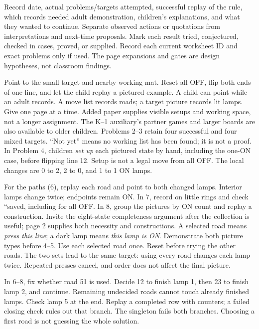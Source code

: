 \documentclass[12pt]{extarticle}
\begin{document}
Record date, actual problems/targets attempted, successful replay of the rule, which records needed adult demonstration, children's explanations, and what they wanted to continue. Separate observed actions or quotations from interpretations and next-time proposals. Mark each result tried, conjectured, checked in cases, proved, or supplied. Record each current worksheet ID and exact problems only if used. The page expansions and gates are design hypotheses, not classroom findings.


\newpage
{}
Point to the small target and nearby working mat. Reset all OFF, flip both ends of one line, and let the child replay a pictured example. A child can point while an adult records. A move list records roads; a target picture records lit lamps. Give one page at a time. Added paper supplies visible setups and working space, not a longer assignment. The K--1 auxiliary's partner games and larger boards are also available to older children.
Problems 2--3 retain four successful and four mixed targets. ``Not yet'' means no working list has been found; it is not a proof. In Problem 4, children \emph{set up} each pictured state by hand, including the one-ON case, before flipping line 12. Setup is not a legal move from all OFF. The local changes are 0 to 2, 2 to 0, and 1 to 1 ON lamps.\par
For the paths (6), replay each road and point to both changed lamps. Interior lamps change twice; endpoints remain ON. In 7, record on little rings and check ``saved, including for all OFF. In 8, group the pictures by ON count and replay a construction. Invite the eight-state completeness argument after the collection is useful; page 2 supplies both necessity and constructions.
A selected road means \emph{press this line}; a dark lamp means \emph{this lamp is ON}. Demonstrate both picture types before 4--5. Use each selected road once. Reset before trying the other roads. The two sets lead to the same target: using every road changes each lamp twice. Repeated presses cancel, and order does not affect the final picture.\par
In 6--8, fix whether road 51 is used. Decide 12 to finish lamp 1, then 23 to finish lamp 2, and continue. Remaining undecided roads cannot touch already finished lamps. Check lamp 5 at the end. Replay a completed row with counters; a failed closing check rules out that branch. The singleton fails both branches. Choosing a first road is not guessing the whole solution.\par
\end{document}
